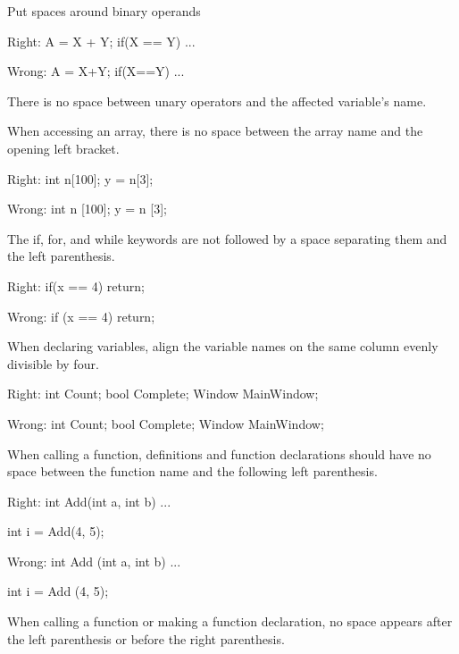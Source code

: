 \item
Put spaces around binary operands

Right:
\startCodeExample
\starttyping
A = X + Y;
if(X == Y)
    ...
\stoptyping
\stopCodeExample

Wrong:
\startCodeExample
\starttyping
A = X+Y;
if(X==Y)
    ...
\stoptyping
\stopCodeExample

\item
There is no space between unary operators and the affected variable's name.

\item
When accessing an array, there is no space between the array name and the opening left bracket. 

Right:
\startCodeExample
\starttyping
int n[100];
y = n[3];
\stoptyping
\stopCodeExample

Wrong:
\startCodeExample
\starttyping
int n [100];
y = n [3];
\stoptyping
\stopCodeExample

\item
The if, for, and while keywords are not followed by a space separating them and the left parenthesis. 

Right:
\startCodeExample
\starttyping
if(x == 4)
    return;
\stoptyping
\stopCodeExample

Wrong:
\startCodeExample
\starttyping
if (x == 4)
    return;
\stoptyping
\stopCodeExample

\item
When declaring variables, align the variable names on the same column evenly divisible by four.

Right:
\startCodeExample
\starttyping
int     Count;
bool    Complete;
Window  MainWindow;
\stoptyping
\stopCodeExample

Wrong:
\startCodeExample
\starttyping
int Count;
bool Complete;
Window MainWindow;
\stoptyping
\stopCodeExample

\item
When calling a function, definitions and function declarations should have no space between the function name and the following left parenthesis.

Right:
\startCodeExample
\starttyping
int Add(int a, int b)
{ 
    ... 
}

int i = Add(4, 5);
\stoptyping
\stopCodeExample

Wrong:
\startCodeExample
\starttyping
int Add (int a, int b)
{
    ...
}

int i = Add (4, 5);
\stoptyping
\stopCodeExample

\item
When calling a function or making a function declaration, no space appears after the left parenthesis or before the right parenthesis.

